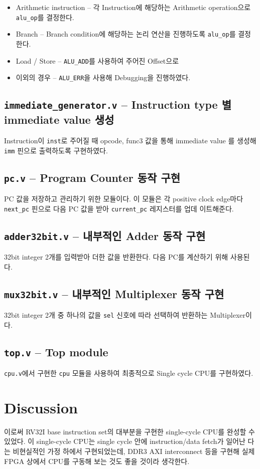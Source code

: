 \documentclass{scrartcl}
\begin{document}
\begin{itemize}
  \item Arithmetic instruction -- 각 Instruction에 해당하는 Arithmetic operation으로 \texttt{alu\_op}를 결정한다.
  \item Branch -- Branch condition에 해당하는 논리 연산을 진행하도록 \texttt{alu\_op}를 결정한다.
  \item Load / Store -- \texttt{ALU\_ADD}를 사용하여 주어진 Offset으로
  \item 이외의 경우 -- \texttt{ALU\_ERR}을 사용해 Debugging을 진행하였다.
\end{itemize}

\subsection{\texttt{immediate\_generator.v} -- Instruction type 별 immediate value 생성}
Instruction이 \texttt{inst}로 주어질 때 opcode, func3 값을 통해 immediate value
를 생성해 \texttt{imm} 핀으로 출력하도록 구현하였다.

\subsection{\texttt{pc.v} -- Program Counter 동작 구현}
PC 값을 저장하고 관리하기 위한 모듈이다. 이 모듈은 각 positive clock edge마다
\texttt{next\_pc} 핀으로 다음 PC 값을 받아 \texttt{current\_pc} 레지스터를 업데
이트해준다.

\subsection{\texttt{adder32bit.v} -- 내부적인 Adder 동작 구현}
32bit integer 2개를 입력받아 더한 값을 반환한다. 다음 PC를 계산하기 위해 사용된다.

\subsection{\texttt{mux32bit.v} -- 내부적인 Multiplexer 동작 구현}
32bit integer 2개 중 하나의 값을 \texttt{sel} 신호에 따라 선택하여 반환하는 Multiplexer이다.

\subsection{\texttt{top.v} -- Top module}
\texttt{cpu.v}에서 구현한 \texttt{cpu} 모듈을 사용하여 최종적으로 Single cycle CPU를 구현하였다.

\section{Discussion}
이로써 RV32I base instruction set의 대부분을 구현한 single-cycle CPU를 완성할 수
있었다. 이 single-cycle CPU는 single cycle 안에 instruction/data fetch가 일어난
다는 비현실적인 가정 하에서 구현되었는데, DDR3 AXI interconnect 등을 구현해 실제
FPGA 상에서 CPU를 구동해 보는 것도 좋을 것이라 생각한다.
\end{document}
